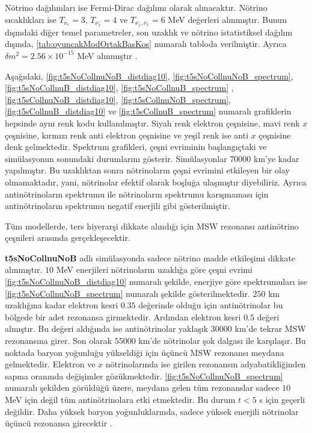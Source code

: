 Nötrino dağılımları ise Fermi-Dirac dağılımı olarak alınacaktır. Nötrino sıcaklıkları ise $ T_{\nu_{e}}=3 $, $T_{\nu_{\bar{x}}}=4 $ ve $T_{\nu_{\bar{x}},\nu_{x}}=6 $ MeV değerleri alınmıştır. Bunun dışındaki diğer temel parametreler, son uzaklık ve nötrino istatistiksel dağılım dışında, \ref{tab:oyuncakModOrtakBasKos} numaralı tabloda verilmiştir. Ayrıca $ \delta m^{2}= 2.56 \times 10^{-15} $ MeV alınmıştır \cite{ParticleDataGroup:2018ovx}.

Aşağıdaki, \ref{fig:t5sNoCollnuNoB_distdiag10}, \ref{fig:t5sNoCollnuNoB_spectrum}, \ref{fig:t5sNoCollnuB_distdiag10}, \ref{fig:t5sNoCollnuB_spectrum} , \ref{fig:t5sCollnuNoB_distdiag10}, \ref{fig:t5sCollnuNoB_spectrum}, \ref{fig:t5sCollnuB_distdiag10} ve \ref{fig:t5sCollnuB_spectrum} numaralı grafiklerin hepsinde aynı renk kodu kullanılmıştır. Siyah renk elektron çeşnisine, mavi renk $ x $ çeşnisine, kırmızı renk anti elektron çeşnisine ve yeşil renk ise anti $ x $ çeşnisine denk gelmektedir. Spektrum grafikleri, çeşni evriminin başlangıçtaki ve simülasyonun sonundaki durumlarını gösterir. Simülasyonlar $ 70000 $ km'ye kadar yapılmıştır. Bu uzaklıktan sonra nötrinoların çeşni evrimini etkileyen bir olay olmamaktadır, yani, nötrinolar efektif olarak boşluğa ulaşmıştır diyebiliriz. Ayrıca antinötrinoların spektrumu ile nötrinoların spektrumu karışmaması için antinötrinoların spektrumu negatif enerjili gibi gösterilmiştir.

Tüm modellerde, ters hiyerarşi dikkate alındığı için MSW rezonansı antinötrino çeşnileri arasında gerçekleşecektir. 

\textbf{t5sNoCollnuNoB} adlı simülasyonda sadece nötrino madde etkileşimi dikkate alınmıştır. $ 10 $ MeV enerjileri nötrinoların uzaklığa göre çeşni evrimi \ref{fig:t5sNoCollnuNoB_distdiag10} numaralı şekilde, enerjiye göre spektrumuları ise \ref{fig:t5sNoCollnuNoB_spectrum} numaralı şekilde gösterilmektedir. $ 250 $ km uzaklığına kadar elektron kesri $ 0.35 $ değerinde olduğu için antinötrinolar bu bölgede bir adet rezonansa girmektedir. Ardından elektron kesri $ 0.5 $ değeri almıştır. Bu değeri aldığında ise antinötrinolar yaklaşık $ 30000 $ km'de tekrar MSW rezonansına girer. Son olarak $ 55000 $ km'de nötrinolar şok dalgası ile karşılaşır. Bu noktada baryon yoğunluğu yükseldiği için üçüncü MSW rezonansı meydana gelmektedir. Elektron ve $ x $ nötrinolarında ise girilen rezonansın adyabatikliğinden sapma oranında değişimler gözükmektedir. \ref{fig:t5sNoCollnuNoB_spectrum} numaralı şekilden görüldüğü üzere, meydana gelen tüm rezonanslar sadece $ 10 $ MeV için değil tüm antinötrinolara etki etmektedir. Bu durum $ t<5 $ s için geçerli değildir. Daha yüksek baryon yoğunluklarında, sadece yüksek enerjili nötrinolar üçüncü rezonansa girecektir \cite{Ekinci:2021miy}.

